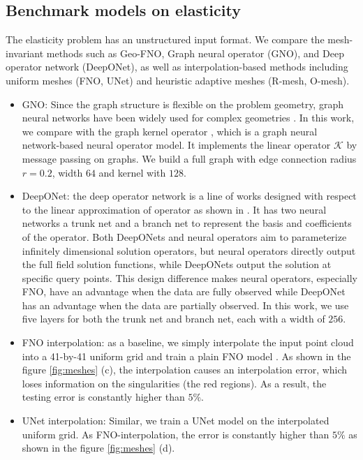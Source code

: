 \documentclass{article}
\begin{document}
\subsection{Benchmark models on elasticity}
The elasticity problem has an unstructured input format. We compare the mesh-invariant methods such as Geo-FNO, Graph neural operator (GNO), and Deep operator network (DeepONet), as well as interpolation-based methods including uniform meshes (FNO, UNet) and heuristic adaptive meshes (R-mesh, O-mesh).
\begin{itemize}
\item GNO: Since the graph structure is flexible on the problem geometry, graph neural networks have been widely used for complex geometries \citep{sanchez2020learning, pfaff2020learning}. In this work, we compare with the graph kernel operator \citep{li2020neural,li2020multipole}, which is a graph neural network-based neural operator model. It implements the linear operator $\mathcal{K}$ by message passing on graphs. We build a full graph with edge connection radius $r=0.2$, width $64$ and kernel with $128$.
\item DeepONet: the deep operator network \citep{lu2019deeponet} is a line of works designed with respect to the linear approximation of operator as shown in \citep{chen1995universal}. It has two neural networks a trunk net and a branch net to represent the basis and coefficients of the operator. Both DeepONets and neural operators aim to parameterize infinitely dimensional solution operators, but neural operators directly output the full field solution functions, while DeepONets output the solution at specific query points. This design difference makes neural operators, especially FNO, have an advantage when the data are fully observed while DeepONet has an advantage when the data are partially observed. In this work, we use five layers for both the trunk net and branch net, each with a width of $256$.
\item FNO interpolation: as a baseline, we simply interpolate the input point cloud into a 41-by-41 uniform grid and train a plain FNO model \citep{li2020fourier}. As shown in the figure \ref{fig:meshes} (c), the interpolation causes an interpolation error, which loses information on the singularities (the red regions). As a result, the testing error is constantly higher than $5\%$.
\item UNet interpolation: Similar, we train a UNet model \citep{ronneberger2015u} on the interpolated uniform grid. As FNO-interpolation, the error is constantly higher than $5\%$ as shown in the figure \ref{fig:meshes} (d).

\end{itemize}
\end{document}
